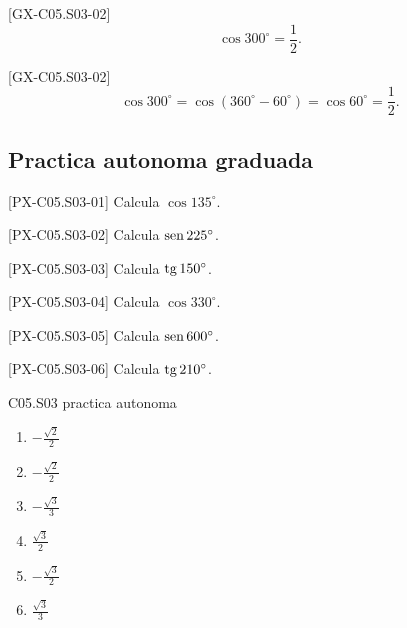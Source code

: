 \begin{shortanswer}{[GX-C05.S03-02]}
\[
\cos 300^\circ=\frac{1}{2}.
\]
\end{shortanswer}

\begin{fullsolution}{[GX-C05.S03-02]}
\[
\cos 300^\circ=\cos(360^\circ-60^\circ)=\cos 60^\circ=\frac{1}{2}.
\]
\end{fullsolution}

\subsection*{Practica autonoma graduada}
\begin{exercise}{[PX-C05.S03-01] Calcula \(\cos 135^\circ\).}
\end{exercise}
\begin{exercise}{[PX-C05.S03-02] Calcula \(\operatorname{sen} 225^\circ\).}
\end{exercise}
\begin{exercise}{[PX-C05.S03-03] Calcula \(\operatorname{tg} 150^\circ\).}
\end{exercise}
\begin{exercise}{[PX-C05.S03-04] Calcula \(\cos 330^\circ\).}
\end{exercise}
\begin{exercise}{[PX-C05.S03-05] Calcula \(\operatorname{sen} 600^\circ\).}
\end{exercise}
\begin{exercise}{[PX-C05.S03-06] Calcula \(\operatorname{tg} 210^\circ\).}
\end{exercise}

\begin{shortanswer}{C05.S03 practica autonoma}
\begin{enumerate}[label=\textbf{PX-C05.S03-\arabic*:}, leftmargin=*]
  \item \(-\frac{\sqrt{2}}{2}\)
  \item \(-\frac{\sqrt{2}}{2}\)
  \item \(-\frac{\sqrt{3}}{3}\)
  \item \(\frac{\sqrt{3}}{2}\)
  \item \(-\frac{\sqrt{3}}{2}\)
  \item \(\frac{\sqrt{3}}{3}\)
\end{enumerate}
\end{shortanswer}

